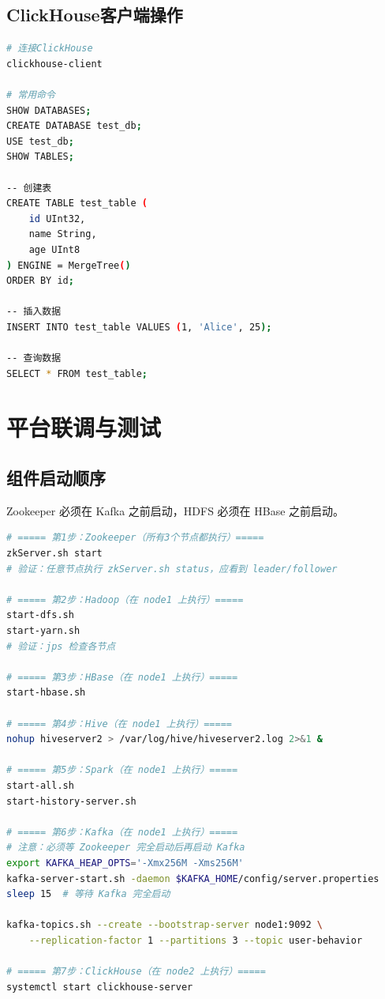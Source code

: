 \documentclass[12pt,a4paper]{article}
\begin{document}
\subsection{ClickHouse客户端操作}

\begin{lstlisting}[language=bash]
# 连接ClickHouse
clickhouse-client

# 常用命令
SHOW DATABASES;
CREATE DATABASE test_db;
USE test_db;
SHOW TABLES;

-- 创建表
CREATE TABLE test_table (
    id UInt32,
    name String,
    age UInt8
) ENGINE = MergeTree()
ORDER BY id;

-- 插入数据
INSERT INTO test_table VALUES (1, 'Alice', 25);

-- 查询数据
SELECT * FROM test_table;
\end{lstlisting}

\section{平台联调与测试}

\subsection{组件启动顺序}

\begin{tipbox}
Zookeeper 必须在 Kafka 之前启动，HDFS 必须在 HBase 之前启动。
\end{tipbox}

\begin{lstlisting}[language=bash]
# ===== 第1步：Zookeeper（所有3个节点都执行）=====
zkServer.sh start
# 验证：任意节点执行 zkServer.sh status，应看到 leader/follower

# ===== 第2步：Hadoop（在 node1 上执行）=====
start-dfs.sh
start-yarn.sh
# 验证：jps 检查各节点

# ===== 第3步：HBase（在 node1 上执行）=====
start-hbase.sh

# ===== 第4步：Hive（在 node1 上执行）=====
nohup hiveserver2 > /var/log/hive/hiveserver2.log 2>&1 &

# ===== 第5步：Spark（在 node1 上执行）=====
start-all.sh
start-history-server.sh

# ===== 第6步：Kafka（在 node1 上执行）=====
# 注意：必须等 Zookeeper 完全启动后再启动 Kafka
export KAFKA_HEAP_OPTS='-Xmx256M -Xms256M'
kafka-server-start.sh -daemon $KAFKA_HOME/config/server.properties
sleep 15  # 等待 Kafka 完全启动

kafka-topics.sh --create --bootstrap-server node1:9092 \
    --replication-factor 1 --partitions 3 --topic user-behavior

# ===== 第7步：ClickHouse（在 node2 上执行）=====
systemctl start clickhouse-server
\end{lstlisting}
\end{document}
